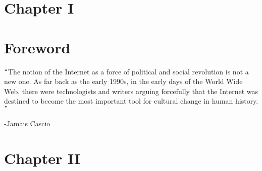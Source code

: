 \documentclass[12pt]{report}
\begin{document}
\vspace{\baselineskip}

\vspace{\baselineskip}

\vspace{\baselineskip}

\vspace{\baselineskip}

\vspace{\baselineskip}



\newpage

\vspace{\baselineskip}
\vspace{\baselineskip}
\section*{Chapter I}
\section*{Foreword}

\vspace{\baselineskip}
$``$The notion of the Internet as a force of political and social revolution is not a new one. As far back as the early 1990s, in the early days of the World Wide Web, there were technologists and writers arguing forcefully that the Internet was destined to become the most important tool for cultural change in human history.$"$  \par

-Jamais Cascio\par


\vspace{\baselineskip}

\vspace{\baselineskip}

\vspace{\baselineskip}



\newpage

\vspace{\baselineskip}
\vspace{\baselineskip}
\section*{Chapter II}
\end{document}
